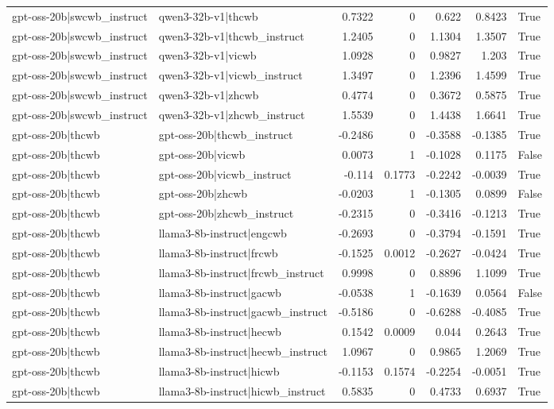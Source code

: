 \begin{table}
\begin{tabular}{l l r r r r l}
gpt-oss-20b|swcwb_instruct & qwen3-32b-v1|thcwb & 0.7322 & 0 & 0.622 & 0.8423 & True \\
gpt-oss-20b|swcwb_instruct & qwen3-32b-v1|thcwb_instruct & 1.2405 & 0 & 1.1304 & 1.3507 & True \\
gpt-oss-20b|swcwb_instruct & qwen3-32b-v1|vicwb & 1.0928 & 0 & 0.9827 & 1.203 & True \\
gpt-oss-20b|swcwb_instruct & qwen3-32b-v1|vicwb_instruct & 1.3497 & 0 & 1.2396 & 1.4599 & True \\
gpt-oss-20b|swcwb_instruct & qwen3-32b-v1|zhcwb & 0.4774 & 0 & 0.3672 & 0.5875 & True \\
gpt-oss-20b|swcwb_instruct & qwen3-32b-v1|zhcwb_instruct & 1.5539 & 0 & 1.4438 & 1.6641 & True \\
gpt-oss-20b|thcwb & gpt-oss-20b|thcwb_instruct & -0.2486 & 0 & -0.3588 & -0.1385 & True \\
gpt-oss-20b|thcwb & gpt-oss-20b|vicwb & 0.0073 & 1 & -0.1028 & 0.1175 & False \\
gpt-oss-20b|thcwb & gpt-oss-20b|vicwb_instruct & -0.114 & 0.1773 & -0.2242 & -0.0039 & True \\
gpt-oss-20b|thcwb & gpt-oss-20b|zhcwb & -0.0203 & 1 & -0.1305 & 0.0899 & False \\
gpt-oss-20b|thcwb & gpt-oss-20b|zhcwb_instruct & -0.2315 & 0 & -0.3416 & -0.1213 & True \\
gpt-oss-20b|thcwb & llama3-8b-instruct|engcwb & -0.2693 & 0 & -0.3794 & -0.1591 & True \\
gpt-oss-20b|thcwb & llama3-8b-instruct|frcwb & -0.1525 & 0.0012 & -0.2627 & -0.0424 & True \\
gpt-oss-20b|thcwb & llama3-8b-instruct|frcwb_instruct & 0.9998 & 0 & 0.8896 & 1.1099 & True \\
gpt-oss-20b|thcwb & llama3-8b-instruct|gacwb & -0.0538 & 1 & -0.1639 & 0.0564 & False \\
gpt-oss-20b|thcwb & llama3-8b-instruct|gacwb_instruct & -0.5186 & 0 & -0.6288 & -0.4085 & True \\
gpt-oss-20b|thcwb & llama3-8b-instruct|hecwb & 0.1542 & 0.0009 & 0.044 & 0.2643 & True \\
gpt-oss-20b|thcwb & llama3-8b-instruct|hecwb_instruct & 1.0967 & 0 & 0.9865 & 1.2069 & True \\
gpt-oss-20b|thcwb & llama3-8b-instruct|hicwb & -0.1153 & 0.1574 & -0.2254 & -0.0051 & True \\
gpt-oss-20b|thcwb & llama3-8b-instruct|hicwb_instruct & 0.5835 & 0 & 0.4733 & 0.6937 & True \\

\end{tabular}
\end{table}
